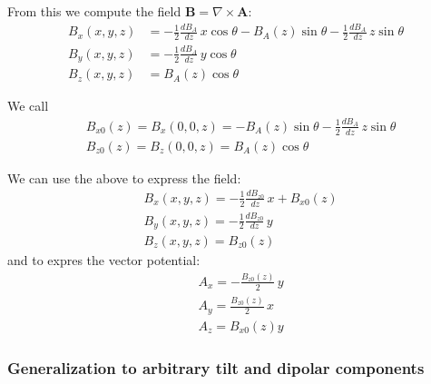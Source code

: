 From this we compute the field $\mathbf{B} = \nabla \times \mathbf{A}$:
\begin{align}
B_x(x,y,z) &= -\frac{1}{2} \frac{dB_A}{dz} \, x \cos\theta - B_A(z) \sin\theta - \frac{1}{2} \frac{dB_A}{dz} \, z \sin\theta  \\
B_y(x,y,z) &= -\frac{1}{2} \frac{dB_A}{dz} \, y \cos\theta \\
B_z(x,y,z) &= B_A(z) \cos\theta
\end{align}

We call
\begin{align}
&\boxed{B_{x0}(z) = B_x(0,0,z) = -B_A(z) \sin\theta - \frac{1}{2} \frac{dB_A}{dz} \, z \sin\theta }\\
&\boxed{B_{z0}(z) = B_z(0,0,z) = B_A(z) \cos\theta}
\end{align}

We can use the above to express the field:
\begin{align}
&\boxed{B_x(x,y,z) = -\frac{1}{2} \frac{dB_{z0}}{dz} \, x  + B_{x0}(z)} \\
&\boxed{B_y(x,y,z) = -\frac{1}{2} \frac{dB_{z0}}{dz} \, y} \\
&\boxed{B_z(x,y,z) = B_{z0}(z)}
\end{align}
and to expres the vector potential:
\begin{align}
&\boxed{A_x = -\frac{B_{z0}(z)}{2} \, y}\\
&\boxed{A_y = \frac{B_{z0}(z)}{2} \, x}\\
&\boxed{A_z = B_{x0}(z) y}
\end{align}

\subsubsection{Generalization to arbitrary tilt and dipolar components}

